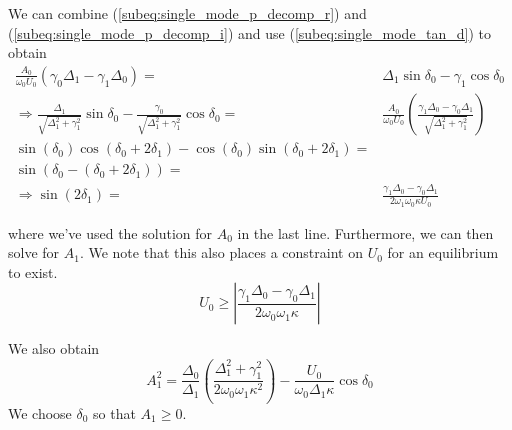 We can combine (\ref{subeq:single_mode_p_decomp_r}) and (\ref{subeq:single_mode_p_decomp_i}) and use (\ref{subeq:single_mode_tan_d}) to obtain
\begin{subequations}
\begin{align}
\frac{A_0}{\omega_0 U_0}\left(\gamma_0 \Delta_1 - \gamma_1 \Delta_0 \right) = & \Delta_1 \sin\delta_0 - \gamma_1 \cos\delta_0 \\
\Rightarrow \frac{\Delta_1}{\sqrt{\Delta_1^2 + \gamma_1^2}}\sin\delta_0 - \frac{\gamma_0}{\sqrt{\Delta_1^2 + \gamma_1^2}}\cos\delta_0 = & \frac{A_0}{\omega_0 U_0}\left(\frac{\gamma_1\Delta_0 - \gamma_0\Delta_1}{\sqrt{\Delta_1^2 + \gamma_1^2}}\right) \\
\sin(\delta_0) \cos(\delta_0 + 2\delta_1) - \cos(\delta_0)\sin(\delta_0 + 2\delta_1) = & \\
\sin(\delta_0 - (\delta_0 + 2\delta_1)) = & \\
\Rightarrow \sin(2\delta_1) = & \frac{\gamma_1\Delta_0 - \gamma_0\Delta_1}{2\omega_1\omega_0\kappa U_0}
\end{align}
\end{subequations}

where we've used the solution for $A_0$ in the last line. Furthermore, we can then solve for $A_1$. We note that this also places a constraint on $U_0$ for an equilibrium to exist.
\begin{equation}
U_0 \geq \left| \frac{\gamma_1 \Delta_0 - \gamma_0 \Delta_1}{2\omega_0\omega_1\kappa} \right| 
\end{equation}

We also obtain
\begin{equation}
A_1^2 = \frac{\Delta_0}{\Delta_1}\left(\frac{\Delta_1^2 + \gamma_1^2}{2\omega_0\omega_1\kappa^2}\right) - \frac{U_0}{\omega_0 \Delta_1 \kappa}\cos\delta_0
\end{equation}
We choose $\delta_0$ so that $A_1 \geq 0$.

